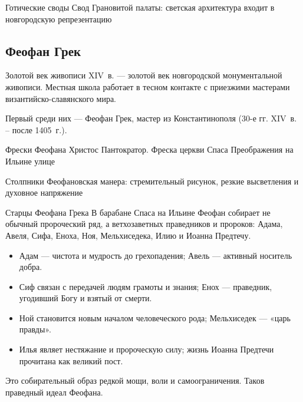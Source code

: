 \begin{frame}{Готические своды}
    {Свод Грановитой палаты:
     светская архитектура входит в новгородскую репрезентацию}
\end{frame}

\subsection{Феофан Грек}

\begin{frame}{Золотой век живописи}
  XIV~в. --- золотой век новгородской монументальной живописи.
  Местная школа работает в тесном контакте с приезжими мастерами
  византийско-славянского мира.

  \vspace{0.8em}
  Первый среди них --- Феофан Грек, мастер из Константинополя
  (30-е гг. XIV~в. -- после 1405~г.).
\end{frame}

\begin{frame}{Фрески Феофана}
    {Христос Пантократор.
     Фреска церкви Спаса Преображения на Ильине улице}
\end{frame}

\begin{frame}{Столпники}
    {Феофановская манера:
     стремительный рисунок, резкие высветления и духовное напряжение}
\end{frame}

\begin{frame}{Старцы Феофана Грека}
  В барабане Спаса на Ильине Феофан собирает не обычный
  пророческий ряд, а ветхозаветных праведников и пророков:
  Адама, Авеля, Сифа, Еноха, Ноя, Мельхиседека, Илию
  и Иоанна Предтечу.

  \begin{itemize}
    \item Адам --- чистота и мудрость до грехопадения;
          Авель --- активный носитель добра.
    \item Сиф связан с передачей людям грамоты и знания;
          Енох --- праведник, угодивший Богу и взятый от смерти.
    \item Ной становится новым началом человеческого рода;
          Мельхиседек --- «царь правды».
    \item Илья являет нестяжание и пророческую силу;
          жизнь Иоанна Предтечи прочитана как великий пост.
  \end{itemize}

  Это собирательный образ редкой мощи, воли и самоограничения. Таков праведный идеал Феофана.
\end{frame}

